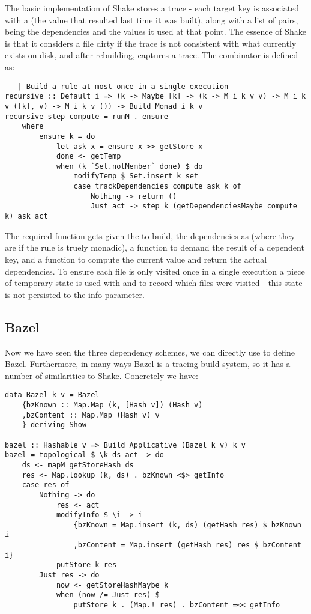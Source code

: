The basic implementation of Shake stores a trace - each target key is associated with a  (the value that resulted last time it was built), along with a list of  pairs, being the dependencies and the values it used at that point. The essence of Shake is that it considers a file dirty if the trace is not consistent with what currently exists on disk, and after rebuilding, captures a trace. The  combinator is defined as:

\begin{verbatim}
-- | Build a rule at most once in a single execution
recursive :: Default i => (k -> Maybe [k] -> (k -> M i k v v) -> M i k v ([k], v) -> M i k v ()) -> Build Monad i k v
recursive step compute = runM . ensure
    where
        ensure k = do
            let ask x = ensure x >> getStore x
            done <- getTemp
            when (k `Set.notMember` done) $ do
                modifyTemp $ Set.insert k set
                case trackDependencies compute ask k of
                    Nothing -> return ()
                    Just act -> step k (getDependenciesMaybe compute k) ask act
\end{verbatim}

The required  function gets given the  to build, the dependencies as  (where they are  if the rule is truely monadic), a function to demand the result of a dependent key, and a function to compute the current value and return the actual dependencies. To ensure each file is only visited once in a single execution a piece of temporary state is used with  and  to record which files were visited - this state is not persisted to the  info parameter.

\subsection{Bazel}

Now we have seen the three dependency schemes, we can directly use  to define Bazel. Furthermore, in many ways Bazel is a tracing build system, so it has a number of similarities to Shake. Concretely we have:

\begin{verbatim}
data Bazel k v = Bazel
    {bzKnown :: Map.Map (k, [Hash v]) (Hash v)
    ,bzContent :: Map.Map (Hash v) v
    } deriving Show

bazel :: Hashable v => Build Applicative (Bazel k v) k v
bazel = topological $ \k ds act -> do
    ds <- mapM getStoreHash ds
    res <- Map.lookup (k, ds) . bzKnown <$> getInfo
    case res of
        Nothing -> do
            res <- act
            modifyInfo $ \i -> i
                {bzKnown = Map.insert (k, ds) (getHash res) $ bzKnown i
                ,bzContent = Map.insert (getHash res) res $ bzContent i}
            putStore k res
        Just res -> do
            now <- getStoreHashMaybe k
            when (now /= Just res) $
                putStore k . (Map.! res) . bzContent =<< getInfo
\end{verbatim}

